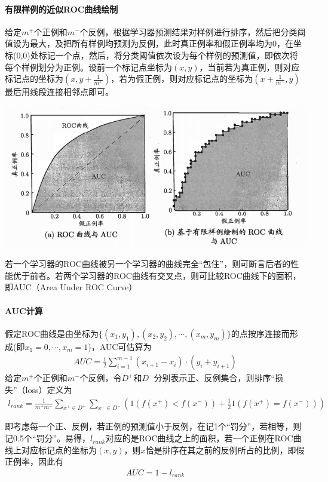\paragraph{有限样例的近似ROC曲线绘制}给定$m^+$个正例和$m^-$个反例，根据学习器预测结果对样例进行排序，然后把分类阈值设为最大，及把所有样例均预测为反例，此时真正例率和假正例率均为0，在坐标(0,0)处标记一个点，然后，将分类阈值依次设为每个样例的预测值，即依次将每个样例划分为正例。设前一个标记点坐标为$(x,y)$，当前若为真正例，则对应标记点的坐标为$(x,y+\frac{1}{m^+})$，若为假正例，则对应标记点的坐标为$(x+\frac{1}{m^-},y)$最后用线段连接相邻点即可。
\begin{center}
\includegraphics[scale=0.6]{../figures/RAMS3.PNG} 
\end{center}
若一个学习器的ROC曲线被另一个学习器的曲线完全“包住”，则可断言后者的性能优于前者。若两个学习器的ROC曲线有交叉点，则可比较ROC曲线下的面积，即AUC（Area Under ROC Curve）
\paragraph{AUC计算}假定ROC曲线是由坐标为$\{ (x_1,y_1),(x_2,y_2),\cdots,(x_m,y_m) \}$的点按序连接而形成(即$x_1=0,\cdots,x_m=1$)，AUC可估算为
\begin{eqnarray}
AUC=\frac{1}{2}\sum_{i=1}^{m-1}(x_{i+1}-x_i)\cdot(y_i+y_{i+1})
\end{eqnarray}
给定$m^+$个正例和$m^-$个反例，令$D^+$和$D^-$分别表示正、反例集合，则排序“损失”（loss）定义为
\begin{eqnarray}
l_{rank}=\frac{1}{m^+m^-}\sum_{x^+\in D^+}\sum_{x^-\in D^-}
\left(
	1(f(x^+)<f(x^-))+\frac{1}{2}1(f(x^+)=f(x^-))
\right)
\end{eqnarray}

即考虑每一个正、反例，若正例的预测值小于反例，在记1个“罚分”，若相等，则记0.5个“罚分”。易得，$l_{rank}$对应的是ROC曲线之上的面积，若一个正例在ROC曲线上对应标记点的坐标为$(x,y)$，则$x$恰是排序在其之前的反例所占的比例，即假正例率，因此有
\begin{eqnarray}
AUC=1-l_{rank}
\end{eqnarray}

